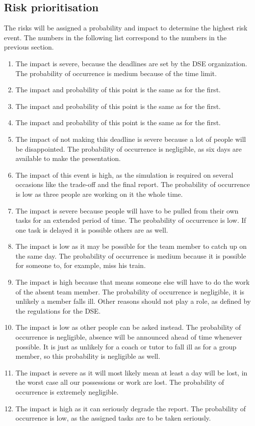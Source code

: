 \subsection{Risk prioritisation}
The risks will be assigned a probability and impact to determine the highest risk event. The numbers in the following list correspond to the numbers in the previous section.
\begin{enumerate}
	\item The impact is severe, because the deadlines are set by the DSE organization. The probability of occurrence is medium because of the time limit.
	\item The impact and probability of this point is the same as for the first.
	\item The impact and probability of this point is the same as for the first.
	\item The impact and probability of this point is the same as for the first.
	\item The impact of not making this deadline is severe because a lot of people will be disappointed. The probability of occurrence is negligible, as six days are available to make the presentation.
	\item The impact of this event is high, as the simulation is required on several occasions like the trade-off and the final report. The probability of occurrence is low as three people are working on it the whole time.
	\item The impact is severe because people will have to be pulled from their own tasks for an extended period of time. The probability of occurrence is low. If one task is delayed it is possible others are as well.
	\item The impact is low as it may be possible for the team member to catch up on the same day. The probability of occurrence is medium because it is possible for someone to, for example, miss his train.
	\item The impact is high because that means someone else will have to do the work of the absent team member. The probability of occurrence is negligible, it is unlikely a member falls ill. Other reasons should not play a role, as defined by the regulations for the DSE.
	\item The impact is low as other people can be asked instead. The probability of occurrence is negligible, absence will be announced ahead of time whenever possible. It is just as unlikely for a coach or tutor to fall ill as for a group member, so this probability is negligible as well.
	\item The impact is severe as it will most likely mean at least a day will be lost, in the worst case all our possessions or work are lost. The probability of occurrence is extremely negligible.
	\item The impact is high as it can seriously degrade the report. The probability of occurrence is low, as the assigned tasks are to be taken seriously.
\end{enumerate}

